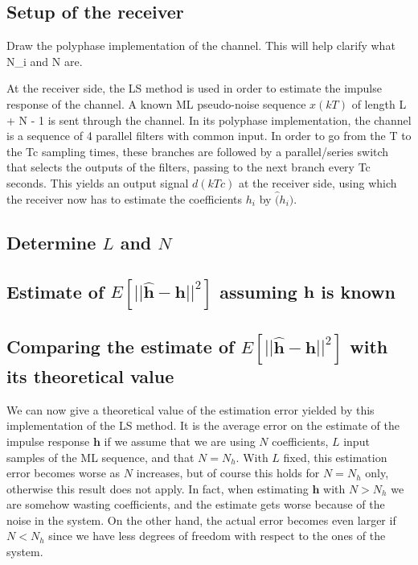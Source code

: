 \documentclass[10pt]{article}
\numberwithin{equation}{section}
\begin{document}
\subsection*{Setup of the receiver}
Draw the polyphase implementation of the channel. This will help clarify what N_i and N are.

At the receiver side, the LS method is used in order to estimate the impulse response of the channel. A known ML pseudo-noise sequence $x(kT)$ of length L + N - 1 is sent through the channel. In its polyphase implementation, the channel is a sequence of 4 parallel filters with common input. In order to go from the T to the Tc sampling times, these branches are followed by a parallel/series switch that selects the outputs of the filters, passing to the next branch every Tc seconds. This yields an output signal $d(kTc)$ at the receiver side, using which the receiver now has to estimate the coefficients $h_i$ by $\hat(h_i)$.

\subsection*{Determine $L$ and $N$}
\subsection*{Estimate of $E[||\mathbf{\hat{h}}-\mathbf{h}||^2]$ assuming $\mathbf{h}$ is known}

\subsection*{Comparing the estimate of $E[||\mathbf{\hat{h}}-\mathbf{h}||^2]$ with its theoretical value}

We can now give a theoretical value of the estimation error yielded by this implementation of the LS method. It is the average error on the estimate of the impulse response $\mathbf{h}$ if we assume that we are using $N$ coefficients, $L$ input samples of the ML sequence, and that $N=N_h$. With $L$ fixed, this estimation error becomes worse as $N$ increases, but of course this holds for $N=N_h$ only, otherwise this result does not apply. In fact, when estimating $\mathbf{h}$ with $N>N_h$ we are somehow wasting coefficients, and the estimate gets worse because of the noise in the system. On the other hand, the actual error becomes even larger if $N<N_h$ since we have less degrees of freedom with respect to the ones of the system.
\end{document}
